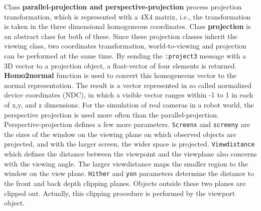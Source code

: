 Class {\bf parallel-projection and perspective-projection} process
projection transformation, which is represented with a 4X4 matrix,
i.e., the transformation is taken in the three dimensional homogeneous
coordinates.
Class {\bf projection} is an abstract class for both of these.
Since these projection classes inherit the viewing class,
two coordinates transformation, world-to-viewing and projection
can be performed at the same time.
By sending the {\tt  :project3} message with a 3D vector to a projection object,
a float-vector of four elements is returned.
{\bf Homo2normal} function is used to convert this homogeneous vector
to the normal representation.
The result is a vector represented in so called normalized device coordinates
(NDC), in which a visible vector ranges within -1 to 1
in each of x,y, and z dimensions.
For the simulation of real cameras in a robot world,
the perspective projection is used more often than the parallel-projection.
Perspective-projection defines a few more parameters.
{\tt Screenx} and {\tt screeny} are the sizes of the window on the
viewing plane on which observed objects are projected,
and with the larger screen, the wider space is projected.
{\tt Viewdistance} which defines the distance between the viewpoint
and the viewplane also concerns with the viewing angle.
The larger viewdistance maps the smaller region to the window on the view plane.
{\tt Hither} and {\tt yon} parameters determine the distance to the front and back
depth clipping planes.
Objects outside these two planes are clipped out.
Actually, this clipping procedure is performed by the viewport object.

